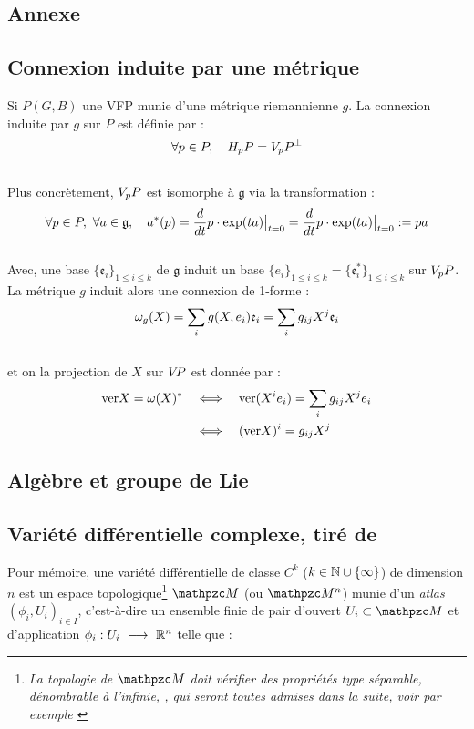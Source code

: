 \begin{annexe}

\section{Annexe}

\subsection{Connexion induite par une métrique}

Si $P(G,B)$ une VFP munie d'une métrique riemannienne $g$. La connexion induite par $g$ sur $P$ est définie par :
\begin{equation}
	\forall p\in P,\quad \hg[p]{P} = \vg[p]{P}^\perp
\end{equation}
\\
Plus concrètement, $\vg[p]{P}$ est isomorphe à $\mathfrak{g}$ via la transformation :
\[\forall p\in P,\ \forall a\in\mathfrak{g},\quad a^*(p) = \frac{d}{dt} p\cdot \exp(t a)\big|_{t=0} = \frac{d}{dt} p\cdot \exp(t a)\big|_{t=0}\defeq pa\]
\\
Avec, une base $\{\mathfrak{e}_i\}_{1\leq i\leq k}$ de $\mathfrak{g}$ induit un base $\{e_i\}_{1\leq i\leq k} = \{\mathfrak{e}^*_i\}_{1\leq i\leq k}$ sur $\vg[p]{P}$. La métrique $g$ induit alors une connexion de 1-forme :
\[\conn_g(X) = \sum_i g(X, e_i) \mathfrak{e}_i = \sum_i g_{ij}X^j \mathfrak{e}_i\]
\\
et on la projection de $X$ sur $\vg{P}$ est donnée par :
\begin{align*}
	\ver X = \conn(X)^*\quad &\Llr\quad  \ver (X^ie_i) = \sum_i g_{ij}X^j e_i \\
	&\Llr\quad  (\ver X)^i = g_{ij}X^j
\end{align*}


\subsection{Algèbre et groupe de Lie} \label{ann:2Lie}




\subsection{Variété différentielle complexe, tiré de \cite{nakahara_geometry_2003}}\label{ann:VDC}

Pour mémoire, une variété différentielle de classe $C^k$ ($k\in\N\cup\{\infty\}$) de dimension $n$ est un espace topologique\footnote{\itshape
	La topologie de $\manu$ doit vérifier des propriétés type séparable, dénombrable à l'infinie, \etc, qui seront toutes admises dans la suite, voir par exemple \cite[chap. 2]{lafontaine_introduction_2015}}
$\manu$ (ou $\manu^n$) munie d'un \emph{atlas} $(\phi_i, U_i)_{i\in I}$, c'est-à-dire un ensemble finie de pair d'ouvert $U_i\subset \manu$ et d'application $\phi_i :U_i\ \lr\ \R^n$ telle que :
\begin{itemize}
	

\end{itemize}
\end{annexe}
